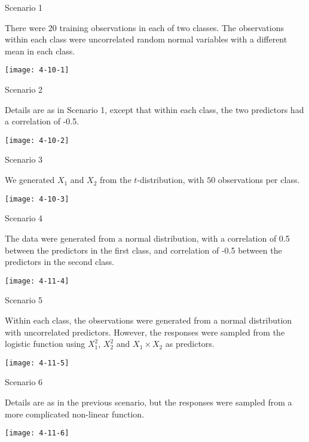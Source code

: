 \documentclass[14pt]{beamer}
\begin{document}
\begin{frame}{Scenario 1}

{\small There were 20 training observations in each of two classes. The observations within each class were uncorrelated random normal variables with a different mean in each class.}

\centerline{\texttt{[image: 4-10-1]}}
	
\end{frame}

\begin{frame}{Scenario 2}

Details are as in Scenario 1, except that within each class, the two predictors had a correlation of -0.5.


\centerline{\texttt{[image: 4-10-2]}}
	
\end{frame}

\begin{frame}{Scenario 3}

We generated $X_1$ and $X_2$ from the $t$-distribution, with $50$ observations per class.

\centerline{\texttt{[image: 4-10-3]}}
	
\end{frame}

\begin{frame}{Scenario 4}

The data were generated from a normal distribution, with a correlation of 0.5 between the predictors in the first class, and correlation of -0.5 between the predictors in the second class.

\centerline{\texttt{[image: 4-11-4]}}
	
\end{frame}


\begin{frame}{Scenario 5}

{\small Within each class, the observations were generated from a normal distribution with uncorrelated predictors. However, the responses were sampled from the logistic function using $X_1^2$, $X_2^2$ and $X_1 \times X_2$ as predictors.}

\centerline{\texttt{[image: 4-11-5]}}
	
\end{frame}

\begin{frame}{Scenario 6}

Details are as in the previous scenario, but the responses were sampled from a more complicated non-linear function.

\centerline{\texttt{[image: 4-11-6]}}
	
\end{frame}
\end{document}
